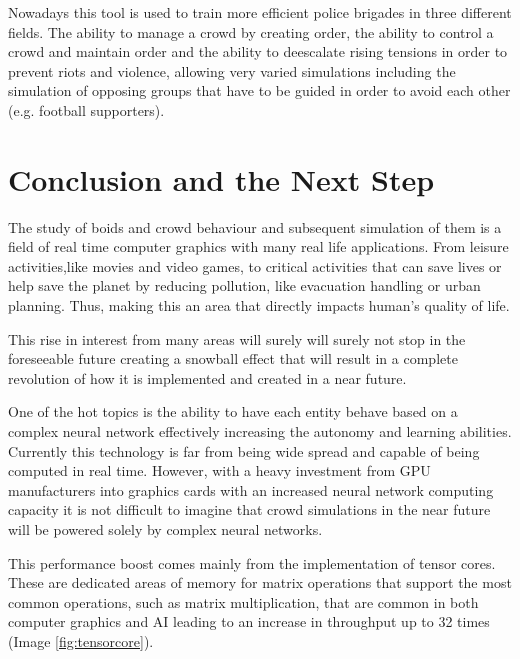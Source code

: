 \documentclass[sigconf]{acmart}
\begin{document}
Nowadays this tool is used to train more efficient police brigades in three different fields. The ability to
manage a crowd by creating order, the ability to control a crowd and maintain order and the ability to deescalate
rising tensions in order to prevent riots and violence, allowing very varied simulations including the simulation
of opposing groups that have to be guided in order to avoid each other (e.g. football supporters).


\section{Conclusion and the Next Step}
The study of boids and crowd behaviour and subsequent simulation of them is a field of real time computer graphics with
many real life applications. From leisure activities,like movies and video games, to critical activities that can
save lives or help save the planet by reducing pollution, like evacuation handling or urban planning. Thus, making
this an area that directly impacts human's quality of life. 

This rise in interest from many areas will surely will surely not stop in the foreseeable future creating a snowball
effect that will result in a complete revolution of how it is implemented and created in a near future.

One of the hot topics is the ability to have each entity behave based on a complex neural network effectively
increasing the autonomy and learning abilities. Currently this technology is far from being wide spread and
capable of being computed in real time. However, with a heavy investment from GPU manufacturers into graphics
cards with an increased neural network computing capacity\cite{nvidiaAI,amdAI} it is not difficult to imagine
that crowd simulations in the near future will be powered solely by complex neural networks.

This performance boost comes mainly from the implementation of tensor cores. These are dedicated areas of memory
for matrix operations that support the most common operations, such as matrix multiplication, that are common in both
computer graphics and AI leading to an increase in throughput up to 32 times (Image \ref{fig:tensorcore}).
\end{document}
